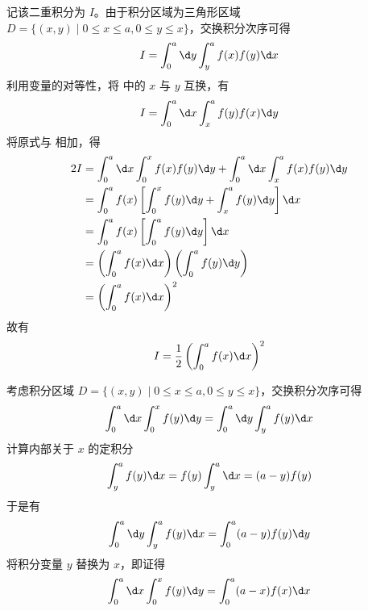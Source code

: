 \begin{myproof}

    记该二重积分为 $I$。由于积分区域为三角形区域 $D = \{ (x, y) \mid 0 \le x \le a, 0 \le y \le x \}$，交换积分次序可得
    \begin{equation}
        I = \int_0^a \d y \int_y^a f(x)f(y) \d x \label{eq:Ident-1}
    \end{equation}
    利用变量的对等性，将  中的 $x$ 与 $y$ 互换，有
    \begin{equation}
        I = \int_0^a \d x \int_x^a f(y)f(x) \d y \label{eq:Ident-2}
    \end{equation}
    将原式与  相加，得
    \begin{equation}
        \begin{aligned}
            2I & = \int_0^a \d x \int_0^x f(x)f(y) \d y + \int_0^a \d x \int_x^a f(x)f(y) \d y \\
               & = \int_0^a f(x) \left[ \int_0^x f(y) \d y + \int_x^a f(y) \d y \right] \d x   \\
               & = \int_0^a f(x) \left[ \int_0^a f(y) \d y \right] \d x                        \\
               & = \left( \int_0^a f(x) \d x \right) \left( \int_0^a f(y) \d y \right)         \\
               & = \left( \int_0^a f(x) \d x \right)^2
        \end{aligned}
    \end{equation}
    故有
    \begin{equation}
        I = \frac{1}{2} \left( \int_0^a f(x) \d x \right)^2
    \end{equation}


    考虑积分区域 $D = \{ (x, y) \mid 0 \le x \le a, 0 \le y \le x \}$，交换积分次序可得
    \begin{equation}
        \int_0^a \d x \int_0^x f(y) \d y = \int_0^a \d y \int_y^a f(y) \d x
    \end{equation}
    计算内部关于 $x$ 的定积分
    \begin{equation}
        \int_y^a f(y) \d x = f(y) \int_y^a \d x = (a - y)f(y)
    \end{equation}
    于是有
    \begin{equation}
        \int_0^a \d y \int_y^a f(y) \d x = \int_0^a (a - y)f(y) \d y
    \end{equation}
    将积分变量 $y$ 替换为 $x$，即证得
    \begin{equation}
        \int_0^a \d x \int_0^x f(y) \d y = \int_0^a (a - x)f(x) \d x
    \end{equation}
\end{myproof}


